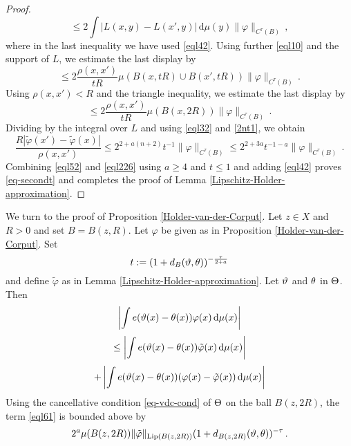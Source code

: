 {\begin{proof}
\begin{equation}
    \le 2  \int |L(x,y)  -L(x',y)|  \, \mathrm{d}\mu(y)
    \|\varphi\|_{C^\tau(B)}\, ,
\end{equation}
where in the last inequality we have used  \eqref{eql42}.
Using further \eqref{eql10} and the support of $L$, we estimate the last display by
\begin{equation}\label{eql224}\le 2  \frac{\rho(x,x')} {tR}\mu(B(x,tR)\cup B(x',tR))
\|\varphi\|_{C^\tau(B)}\, .
    \end{equation}
  Using $\rho(x,x')<R$ and the triangle inequality, we estimate the last display by
\begin{equation}\label{eql225}\le 2
\frac{\rho(x,x')} {tR}
\mu(B(x,2R))
\|\varphi\|_{C^\tau(B)}\, .
    \end{equation}
Dividing by the integral over $L$ and using \eqref{eql32} and \eqref{2nt1}, we obtain
\begin{equation}\label{eql226}
 \frac {R |\tilde{\varphi}(x') - \tilde \varphi(x)|}{\rho(x,x')}
 \le   2^{2+a(n+2)}t^{-1}\|\varphi\|_{C^\tau(B)} \le
 2^{2+3a} t^{-1-a} \|\varphi\|_{C^\tau(B)}\, .
\end{equation}
Combining \eqref{eql52} and  \eqref{eql226} using $a\ge 4$ and $t\le 1$ and
adding \eqref{eql42} proves \eqref{eq-secondt} and completes the proof
of Lemma \ref{Lipschitz-Holder-approximation}.
\end{proof}


We turn to the proof of Proposition \ref{Holder-van-der-Corput}.
Let $z\in X$ and $R>0$ and set $B=B(z,R)$. Let $\varphi$
be given as in Proposition \ref{Holder-van-der-Corput}.
Set
\begin{equation}\label{eql69}
    t:=(1+d_B({\vartheta},{\theta}))^{-\frac{\tau}{2+a}}
\end{equation}
and define $\tilde{\varphi}$ as in Lemma \ref{Lipschitz-Holder-approximation}. Let ${\vartheta}$ and ${\theta}$ in ${\Theta}$.
Then
   \begin{equation}\label{eql60}
       \left|\int e({\vartheta}(x)-{{\theta}(x)}) \varphi (x)\, \mathrm{d}\mu(x)\right|
   \end{equation}
      \begin{equation}\label{eql61}
   \le     \left|\int e({\vartheta}(x)-{{\theta}(x)}) \tilde{\varphi} (x)\, \mathrm{d}\mu(x)\right|
   \end{equation}
           \begin{equation}\label{eql62}
     +  \left|\int e({\vartheta}(x)-{{\theta}(x)}) (\varphi (x)-\tilde{\varphi}(x))\, \mathrm{d}\mu(x)\right|
   \end{equation}
Using the cancellative condition \eqref{eq-vdc-cond}  of ${\Theta}$ on the ball $B(z,2R)$, the term \eqref{eql61} is bounded above by
 \begin{equation}\label{eql63}
       2^a \mu(B(z,2R)) \|\tilde{\varphi}\|_{\operatorname{\operatorname{Lip}}(B(z,2R))} (1 + d_{B(z,2R)}({\vartheta},{\theta}))^{-\tau}  \, .
 \end{equation}



}
